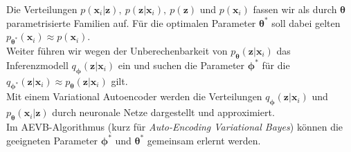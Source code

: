 \documentclass[12pt]{article}
\newcommand{\z}{\mathbf{z}}
\newcommand{\x}{\mathbf{x}_i}
\begin{document}
	Die Verteilungen $p(\x|\z),\ p(\z|\x),\ p(\z)$ und $p(\x)$ fassen wir als durch ${\boldsymbol\theta}$ parametrisierte Familien auf. Für die optimalen Parameter $\boldsymbol\theta^{*}$ soll dabei gelten $p_{\boldsymbol\theta^{*}}(\x) \approx p(\x)$.\\
	Weiter führen wir wegen der Unberechenbarkeit von $p_{\boldsymbol\theta}(\z|\x)$ das Inferenzmodell $q_{\boldsymbol\phi}(\z|\x)$ ein und suchen die Parameter $\boldsymbol\phi^{*}$ für die $q_{\boldsymbol\phi^{*}}(\z|\x) \approx p_{\boldsymbol\theta}(\z|\x)$ gilt.\\
	Mit einem Variational Autoencoder werden die Verteilungen $q_{\boldsymbol\phi}(\z|\x)$ und $p_{\boldsymbol\theta}(\x|\z)$ durch neuronale Netze dargestellt und approximiert.\\
	Im AEVB-Algorithmus (kurz für \emph{Auto-Encoding Variational Bayes}) können die geeigneten Parameter $\boldsymbol\phi^{*}$ und $\boldsymbol\theta^{*}$ gemeinsam erlernt werden.
\end{document}
